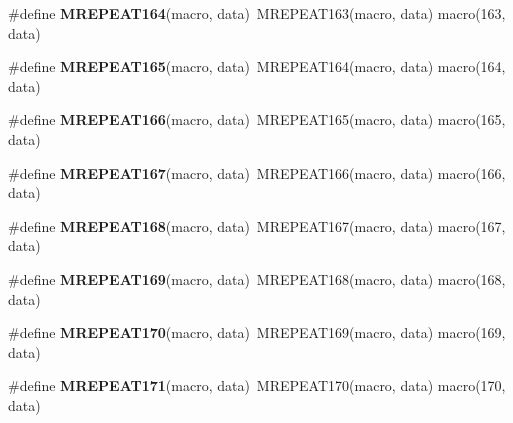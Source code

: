 \begin{DoxyCompactItemize}
\item 
\hypertarget{group__group__sam0__utils__mrepeat_ga5635a788c18814a98cca65d80c06dbfb}{}\#define {\bfseries M\+R\+E\+P\+E\+A\+T164}(macro,  data)~M\+R\+E\+P\+E\+A\+T163(macro, data)   macro(163, data)\label{group__group__sam0__utils__mrepeat_ga5635a788c18814a98cca65d80c06dbfb}

\item 
\hypertarget{group__group__sam0__utils__mrepeat_gaf19e2008c064792f7ae367fab6867c12}{}\#define {\bfseries M\+R\+E\+P\+E\+A\+T165}(macro,  data)~M\+R\+E\+P\+E\+A\+T164(macro, data)   macro(164, data)\label{group__group__sam0__utils__mrepeat_gaf19e2008c064792f7ae367fab6867c12}

\item 
\hypertarget{group__group__sam0__utils__mrepeat_ga75661c9e3f382a6d40eb9da43d79f2d0}{}\#define {\bfseries M\+R\+E\+P\+E\+A\+T166}(macro,  data)~M\+R\+E\+P\+E\+A\+T165(macro, data)   macro(165, data)\label{group__group__sam0__utils__mrepeat_ga75661c9e3f382a6d40eb9da43d79f2d0}

\item 
\hypertarget{group__group__sam0__utils__mrepeat_ga252652614e5e3cb056e487b105bd598c}{}\#define {\bfseries M\+R\+E\+P\+E\+A\+T167}(macro,  data)~M\+R\+E\+P\+E\+A\+T166(macro, data)   macro(166, data)\label{group__group__sam0__utils__mrepeat_ga252652614e5e3cb056e487b105bd598c}

\item 
\hypertarget{group__group__sam0__utils__mrepeat_ga4aa9bd592bf0f9b8f03254451d8693da}{}\#define {\bfseries M\+R\+E\+P\+E\+A\+T168}(macro,  data)~M\+R\+E\+P\+E\+A\+T167(macro, data)   macro(167, data)\label{group__group__sam0__utils__mrepeat_ga4aa9bd592bf0f9b8f03254451d8693da}

\item 
\hypertarget{group__group__sam0__utils__mrepeat_ga1ae14784af3853b01de5837b32a0fdd6}{}\#define {\bfseries M\+R\+E\+P\+E\+A\+T169}(macro,  data)~M\+R\+E\+P\+E\+A\+T168(macro, data)   macro(168, data)\label{group__group__sam0__utils__mrepeat_ga1ae14784af3853b01de5837b32a0fdd6}

\item 
\hypertarget{group__group__sam0__utils__mrepeat_gaf79db8520fe014aa43b33eca106b66df}{}\#define {\bfseries M\+R\+E\+P\+E\+A\+T170}(macro,  data)~M\+R\+E\+P\+E\+A\+T169(macro, data)   macro(169, data)\label{group__group__sam0__utils__mrepeat_gaf79db8520fe014aa43b33eca106b66df}

\item 
\hypertarget{group__group__sam0__utils__mrepeat_ga4f35da901f3f846301ba22c2ebfd64a4}{}\#define {\bfseries M\+R\+E\+P\+E\+A\+T171}(macro,  data)~M\+R\+E\+P\+E\+A\+T170(macro, data)   macro(170, data)\label{group__group__sam0__utils__mrepeat_ga4f35da901f3f846301ba22c2ebfd64a4}


\end{DoxyCompactItemize}

